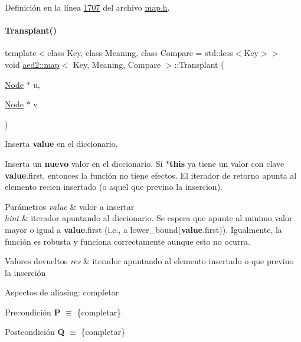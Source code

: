 Definición en la línea \hyperlink{map_8h_source_l01707}{1707} del archivo \hyperlink{map_8h_source}{map.\+h}.

\mbox{\label{classaed2_1_1map_a6c9fb4a85c0e8d2de5dcbdbc0d695be5_a6c9fb4a85c0e8d2de5dcbdbc0d695be5}} 
\paragraph{\texorpdfstring{Transplant()}{Transplant()}}
{\footnotesize\ttfamily template$<$class Key, class Meaning, class Compare = std\+::less$<$\+Key$>$$>$ \\
void \hyperlink{classaed2_1_1map}{aed2\+::map}$<$ Key, Meaning, Compare $>$\+::Transplant (\begin{DoxyParamCaption}\item[{\hyperlink{structaed2_1_1map_1_1Node}{Node} $\ast$}]{u,  }\item[{\hyperlink{structaed2_1_1map_1_1Node}{Node} $\ast$}]{v }\end{DoxyParamCaption})\hspace{0.3cm}{\ttfamily [inline]}}



Inserta {\bfseries value} en el diccionario. 

Inserta un {\bfseries nuevo} valor en el diccionario. Si {\bfseries $\ast$this} ya tiene un valor con clave {\bfseries value}.first, entonces la función no tiene efectos. El iterador de retorno apunta al elemento recien insertado (o aquel que previno la insercion).


\begin{DoxyParams}{Parámetros}
{\em value} & valor a insertar \\
\hline
{\em hint} & iterador apuntando al diccionario. Se espera que apunte al minimo valor mayor o igual a {\bfseries value}.first (i.\+e., a lower\+\_\+bound({\bfseries value}.first)). Igualmente, la función es robusta y funciona correctamente aunque esto no ocurra. \\
\hline
\end{DoxyParams}

\begin{DoxyRetVals}{Valores devueltos}
{\em res} & iterador apuntando al elemento insertado o que previno la inserción\\
\hline
\end{DoxyRetVals}
\begin{DoxyParagraph}{Aspectos de aliasing\+:}
completar
\end{DoxyParagraph}
\begin{DoxyPrecond}{Precondición}
{\bfseries P} $\equiv$ \{completar\} 
\end{DoxyPrecond}
\begin{DoxyPostcond}{Postcondición}
{\bfseries Q} $\equiv$ \{completar\}
\end{DoxyPostcond}

